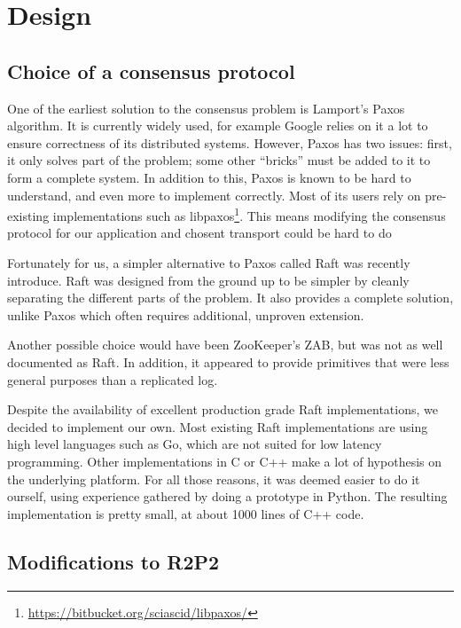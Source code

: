 \chapter{Design}
\label{chap:design}

\section{Choice of a consensus protocol}

One of the earliest solution to the consensus problem is Lamport's Paxos algorithm\cite{paxos}.
It is currently widely used, for example Google relies on it a lot to ensure correctness of its distributed systems\cite{chubby, paxoslive}.
However, Paxos has two issues: first, it only solves part of the problem; some other ``bricks'' must be added to it to form a complete system.
In addition to this, Paxos is known to be hard to understand, and even more to implement correctly.
Most of its users rely on pre-existing implementations such as libpaxos\footnote{\url{https://bitbucket.org/sciascid/libpaxos/}}.
This means modifying the consensus protocol for our application and chosent transport could be hard to do

Fortunately for us, a simpler alternative to Paxos called Raft was recently introduce\cite{raft}.
Raft was designed from the ground up to be simpler by cleanly separating the different parts of the problem.
It also provides a complete solution, unlike Paxos which often requires additional, unproven extension\cite{paxoslive}.

Another possible choice would have been ZooKeeper's ZAB\cite{zookeeper}, but was not as well documented as Raft.
In addition, it appeared to provide primitives that were less general purposes than a replicated log.

Despite the availability of excellent production grade Raft implementations, we decided to implement our own.
Most existing Raft implementations are using high level languages such as Go, which are not suited for low latency programming.
Other implementations in C or C++ make a lot of hypothesis on the underlying platform.
For all those reasons, it was deemed easier to do it ourself, using experience gathered by doing a prototype in Python.
The resulting implementation is pretty small, at about 1000 lines of C++ code.

\section{Modifications to R2P2}


